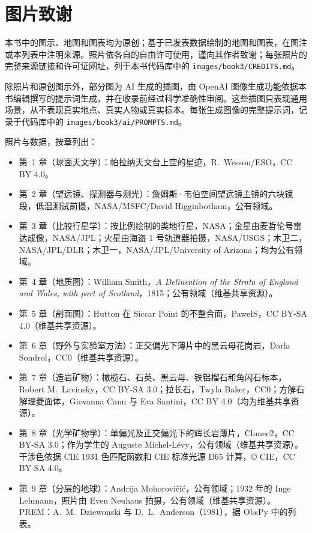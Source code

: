 \chapter*{图片致谢}

本书中的图示、地图和图表均为原创；基于已发表数据绘制的地图和图表，在图注或本列表中注明来源。照片依各自的自由许可使用，谨向其作者致谢；每张照片的完整来源链接和许可证网址，列于本书代码库中的 \texttt{images/book3/CREDITS.md}。

\bigskip
除照片和原创图示外，部分图为 AI 生成的插图，由 OpenAI 图像生成功能依据本书编辑撰写的提示词生成，并在收录前经过科学准确性审阅。这些插图只表现通用场景，从不表现真实地点、真实人物或真实标本。每张生成图像的完整提示词，记录于代码库中的 \texttt{images/book3/ai/PROMPTS.md}。

\bigskip
\noindent 照片与数据，按章列出：
\begin{itemize}\small
  \item 第~1 章（球面天文学）：帕拉纳天文台上空的星迹，R.~Wesson/ESO，CC BY 4.0。
  \item 第~2 章（望远镜、探测器与测光）：詹姆斯·韦伯空间望远镜主镜的六块镜段，低温测试前摄，NASA/MSFC/David Higginbotham，公有领域。
  \item 第~3 章（比较行星学）：按比例绘制的类地行星，NASA；金星由麦哲伦号雷达成像，NASA/JPL；火星由海盗 1 号轨道器拍摄，NASA/USGS；木卫二，NASA/JPL/DLR；木卫一，NASA/JPL/University of Arizona；均为公有领域。
  \item 第~4 章（地质图）：William Smith，\emph{A Delineation of the Strata of England and Wales, with part of Scotland}，1815；公有领域（维基共享资源）。
  \item 第~5 章（剖面图）：Hutton 在 Siccar Point 的不整合面，PawełS，CC BY-SA 4.0（维基共享资源）。
  \item 第~6 章（野外与实验室方法）：正交偏光下薄片中的黑云母花岗岩，Darla Sondrol，CC0（维基共享资源）。
  \item 第~7 章（造岩矿物）：橄榄石、石英、黑云母、铁铝榴石和角闪石标本，Robert M.~Lavinsky，CC BY-SA 3.0；拉长石，Twyla Baker，CC0；方解石解理菱面体，Giovanna Canu 与 Eva Santini，CC BY 4.0（均为维基共享资源）。
  \item 第~8 章（光学矿物学）：单偏光及正交偏光下的辉长岩薄片，Chmee2，CC BY-SA 3.0；作为学生的 Auguste Michel-Lévy，公有领域（维基共享资源）。干涉色依据 CIE 1931 色匹配函数和 CIE 标准光源 D65 计算，\copyright{} CIE，CC BY-SA 4.0。
  \item 第~9 章（分层的地球）：Andrija Mohorovičić，公有领域；1932 年的 Inge Lehmann，照片由 Even Neuhaus 拍摄，公有领域（维基共享资源）。PREM：A.~M.~Dziewonski 与 D.~L.~Anderson（1981），据 ObsPy 中的列表。

\end{itemize}

